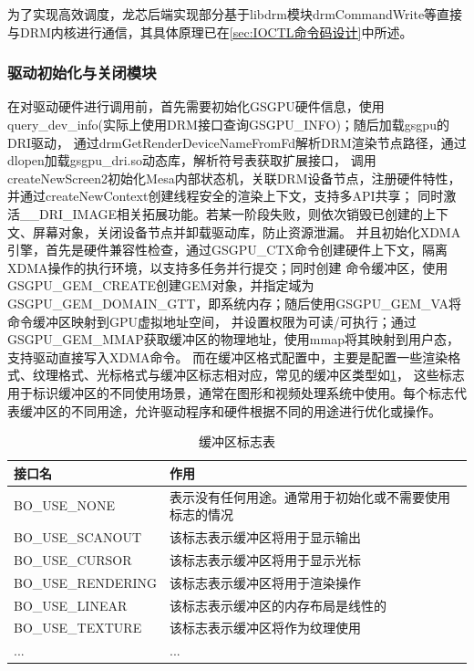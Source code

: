 为了实现高效调度，龙芯后端实现部分基于libdrm模块drmCommandWrite等直接与DRM内核进行通信，其具体原理已在\ref{sec:IOCTL命令码设计}中所述。

\subsubsection{驱动初始化与关闭模块}

在对驱动硬件进行调用前，首先需要初始化GSGPU硬件信息，使用query\_dev\_info(实际上使用DRM接口查询GSGPU\_INFO)；随后加载gsgpu的DRI驱动，
通过drmGetRenderDeviceNameFromFd解析DRM渲染节点路径，通过dlopen加载gsgpu\_dri.so动态库，解析符号表获取扩展接口，
调用createNewScreen2初始化Mesa内部状态机，关联DRM设备节点，注册硬件特性，并通过createNewContext创建线程安全的渲染上下文，支持多API共享；
同时激活\_\_DRI\_IMAGE相关拓展功能。若某一阶段失败，则依次销毁已创建的上下文、屏幕对象，关闭设备节点并卸载驱动库，防止资源泄漏。
并且初始化XDMA引擎，首先是硬件兼容性检查，通过GSGPU\_CTX命令创建硬件上下文，隔离XDMA操作的执行环境，以支持多任务并行提交；同时创建
命令缓冲区，使用GSGPU\_GEM\_CREATE创建GEM对象，并指定域为GSGPU\_GEM\_DOMAIN\_GTT，即系统内存；随后使用GSGPU\_GEM\_VA将命令缓冲区映射到GPU虚拟地址空间，
并设置权限为可读/可执行；通过GSGPU\_GEM\_MMAP获取缓冲区的物理地址，使用mmap将其映射到用户态，支持驱动直接写入XDMA命令。
而在缓冲区格式配置中，主要是配置一些渲染格式、纹理格式、光标格式与缓冲区标志相对应，常见的缓冲区类型如\ref{tab:缓冲区标志表}，
这些标志用于标识缓冲区的不同使用场景，通常在图形和视频处理系统中使用。每个标志代表缓冲区的不同用途，允许驱动程序和硬件根据不同的用途进行优化或操作。

\begin{table}[h]  
  \centering
  \caption{缓冲区标志表}
  \label{tab:缓冲区标志表}
  \begin{tabular}{ll}
    \toprule
    接口名  & 作用\\
    \midrule
    BO\_USE\_NONE & 表示没有任何用途。通常用于初始化或不需要使用标志的情况 \\
    BO\_USE\_SCANOUT & 该标志表示缓冲区将用于显示输出 \\
    BO\_USE\_CURSOR & 该标志表示缓冲区将用于显示光标 \\
    BO\_USE\_RENDERING & 该标志表示缓冲区将用于渲染操作 \\
    BO\_USE\_LINEAR & 该标志表示缓冲区的内存布局是线性的 \\
    BO\_USE\_TEXTURE & 该标志表示缓冲区将作为纹理使用 \\
    ... & ... \\
    \bottomrule
  \end{tabular}
  \note{}
\end{table}

